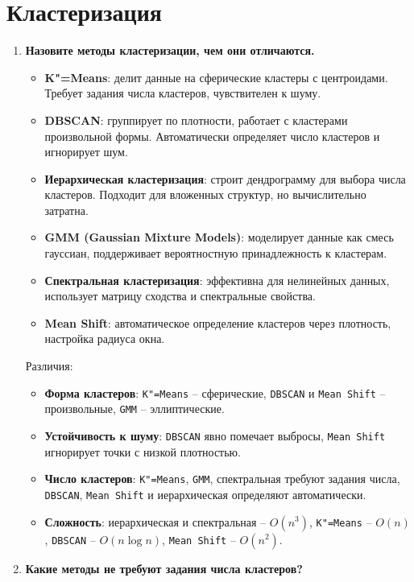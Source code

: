 \documentclass{article}
\begin{document}
\section{Кластеризация}
\begin{enumerate}
    \item \textbf{Назовите методы кластеризации, чем они отличаются.}
        \begin{itemize}
            \item \textbf{K"=Means}: делит данные на сферические кластеры с центроидами. Требует задания числа кластеров, чувствителен к шуму.
            \item \textbf{DBSCAN}: группирует по плотности, работает с кластерами произвольной формы. Автоматически определяет число кластеров и игнорирует шум.
            \item \textbf{Иерархическая кластеризация}: строит дендрограмму для выбора числа кластеров. Подходит для вложенных структур, но вычислительно затратна.
            \item \textbf{GMM (Gaussian Mixture Models)}: моделирует данные как смесь гауссиан, поддерживает вероятностную принадлежность к кластерам.
            \item \textbf{Спектральная кластеризация}: эффективна для нелинейных данных, использует матрицу сходства и спектральные свойства.
            \item \textbf{Mean Shift}: автоматическое определение кластеров через плотность, настройка радиуса окна.
        \end{itemize}
        Различия:
        \begin{itemize}
            \item \textbf{Форма кластеров}: \texttt{K"=Means} -- сферические, \texttt{DBSCAN} и \texttt{Mean Shift} -- произвольные, \texttt{GMM} -- эллиптические.
            \item \textbf{Устойчивость к шуму}: \texttt{DBSCAN} явно помечает выбросы, \texttt{Mean Shift} игнорирует точки с низкой плотностью.
            \item \textbf{Число кластеров}: \texttt{K"=Means}, \texttt{GMM}, спектральная требуют задания числа, \texttt{DBSCAN}, \texttt{Mean Shift} и иерархическая определяют автоматически.
            \item \textbf{Сложность}: иерархическая и спектральная -- \(O(n^3)\), \texttt{K"=Means} -- \(O(n)\), \texttt{DBSCAN} -- \(O(n \log n)\), \texttt{Mean Shift} -- \(O(n^2)\).
        \end{itemize}
    \item \textbf{Какие методы не требуют задания числа кластеров?}

\end{enumerate}
\end{document}
